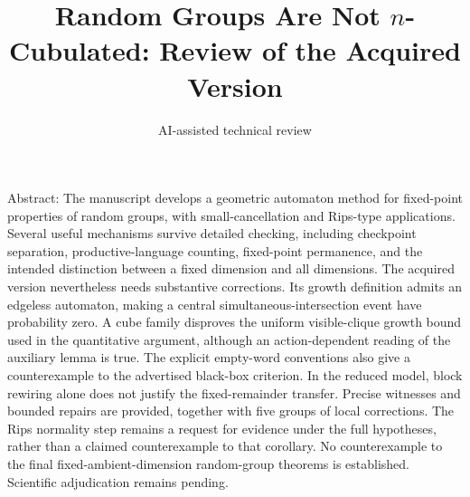\documentclass[10pt]{article}
\title{Random Groups Are Not \(n\)-Cubulated:
Review of the Acquired Version}
\author{AI-assisted technical review}
\date{}
\begin{document}
\maketitle
Abstract: The manuscript develops a geometric automaton method for fixed-point properties of random groups, with small-cancellation and Rips-type applications. Several useful mechanisms survive detailed checking, including checkpoint separation, productive-language counting, fixed-point permanence, and the intended distinction between a fixed dimension and all dimensions. The acquired version nevertheless needs substantive corrections. Its growth definition admits an edgeless automaton, making a central simultaneous-intersection event have probability zero. A cube family disproves the uniform visible-clique growth bound used in the quantitative argument, although an action-dependent reading of the auxiliary lemma is true. The explicit empty-word conventions also give a counterexample to the advertised black-box criterion. In the reduced model, block rewiring alone does not justify the fixed-remainder transfer. Precise witnesses and bounded repairs are provided, together with five groups of local corrections. The Rips normality step remains a request for evidence under the full hypotheses, rather than a claimed counterexample to that corollary. No counterexample to the final fixed-ambient-dimension random-group theorems is established. Scientific adjudication remains pending.\par
\end{document}
